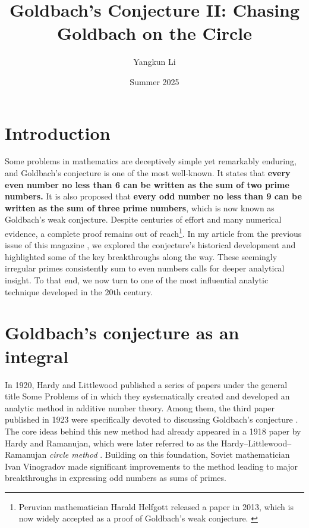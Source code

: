 \documentclass{article}
\title{Goldbach's Conjecture II: Chasing Goldbach on the Circle}
\author{Yangkun Li}
\date{Summer 2025}
\begin{document}
\maketitle

\section{Introduction}
\noindent Some problems in mathematics are deceptively simple yet remarkably enduring, and Goldbach’s conjecture is one of the most well-known. It states that \textbf{every even number no less than 6 can be written as the sum of two prime numbers.} It is also     proposed that \textbf{every odd number no less than 9 can be written as the sum of three prime numbers}, which is now known as Goldbach's weak conjecture.
Despite centuries of effort and many numerical evidence, a complete proof remains out of reach\footnote{Peruvian mathematician Harald Helfgott released a paper in 2013, which is now widely accepted as a proof of Goldbach’s weak conjecture. \cite{H1}}. In my article from the previous issue of this magazine \cite{gold}, we explored the conjecture’s historical development and highlighted some of the key breakthroughs along the way. These seemingly irregular primes consistently sum to even numbers calls for deeper analytical insight. To that end, we now turn to one of the most influential analytic technique developed in the 20th century.

\section{Goldbach's conjecture as an integral}
In 1920, Hardy and Littlewood published a series of papers under the general title Some Problems of  in which they systematically created and developed an analytic method in additive number theory. Among them, the third paper published in 1923 were specifically devoted to discussing Goldbach’s conjecture \cite{hardy}. The core ideas behind this new method had already appeared in a 1918 paper by Hardy and Ramanujan, which were later referred to as the Hardy–Littlewood–Ramanujan \textit{circle method} \cite{pan}. Building on this foundation, Soviet mathematician Ivan Vinogradov made significant improvements to the method leading to major breakthroughs in expressing odd numbers as sums of primes.
\end{document}
